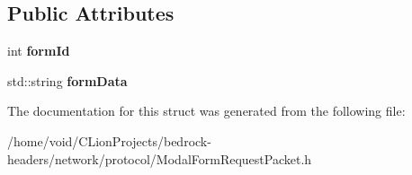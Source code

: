 \subsection*{Public Attributes}
\begin{DoxyCompactItemize}
\item 
\mbox{\label{struct_modal_form_request_packet_a515fa2c7875091a620a80ec1351e1360}} 
int {\bfseries form\+Id}
\item 
\mbox{\label{struct_modal_form_request_packet_ac0079f4bf41a604f07a26b6e9aff8a80}} 
std\+::string {\bfseries form\+Data}
\end{DoxyCompactItemize}


The documentation for this struct was generated from the following file\+:\begin{DoxyCompactItemize}
\item 
/home/void/\+C\+Lion\+Projects/bedrock-\/headers/network/protocol/Modal\+Form\+Request\+Packet.\+h\end{DoxyCompactItemize}
